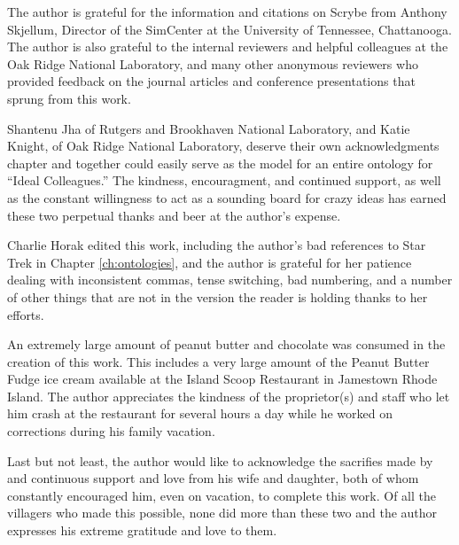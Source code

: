 The author is grateful for the information and citations on Scrybe from Anthony
Skjellum, Director of the SimCenter at the University of Tennessee,
Chattanooga. The author is also grateful to the internal reviewers and helpful
colleagues at the Oak Ridge National Laboratory, and many other anonymous
reviewers who provided feedback on the journal articles and conference
presentations that sprung from this work.

Shantenu Jha of Rutgers and Brookhaven National Laboratory, and Katie Knight, of
Oak Ridge National Laboratory, deserve their own acknowledgments chapter and
together could easily serve as the model for an entire ontology for ``Ideal
Colleagues.'' The kindness, encouragment, and continued support, as well as the
constant willingness to act as a sounding board for crazy ideas has earned these
two perpetual thanks and beer at the author's expense.

Charlie Horak edited this work, including the author's bad references to Star
Trek in Chapter \ref{ch:ontologies}, and the author is grateful for her patience
dealing with inconsistent commas, tense switching, bad numbering, and a number
of other things that are not in the version the reader is holding thanks to her
efforts.

An extremely large amount of peanut butter and chocolate was consumed in the
creation of this work. This includes a very large amount of the Peanut Butter
Fudge ice cream available at the Island Scoop Restaurant in Jamestown Rhode
Island. The author appreciates the kindness of the proprietor(s) and staff who
let him crash at the restaurant for several hours a day while he worked on
corrections during his family vacation.

Last but not least, the author would like to acknowledge the sacrifies made by
and continuous support and love from his wife and daughter, both of whom
constantly encouraged him, even on vacation, to complete this work. Of all the
villagers who made this possible, none did more than these two and the author
expresses his extreme gratitude and love to them.
